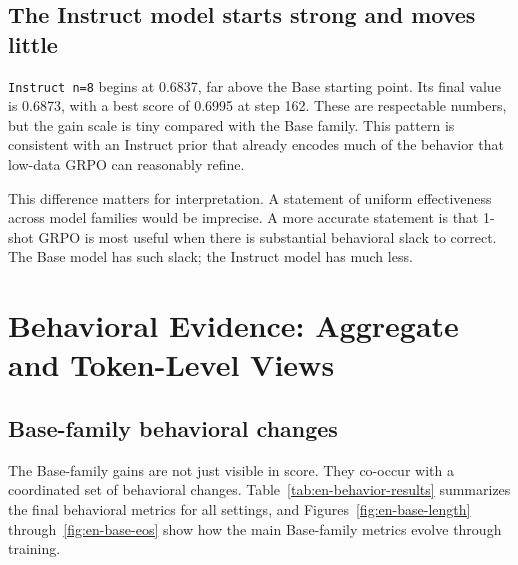 \documentclass[12pt,a4paper]{ctexart}
\begin{document}
\subsection{The Instruct model starts strong and moves little}

\texttt{Instruct n=8} begins at 0.6837, far above the Base starting point. Its final value is 0.6873, with a best score of 0.6995 at step 162. These are respectable numbers, but the gain scale is tiny compared with the Base family. This pattern is consistent with an Instruct prior that already encodes much of the behavior that low-data GRPO can reasonably refine.

This difference matters for interpretation. A statement of uniform effectiveness across model families would be imprecise. A more accurate statement is that 1-shot GRPO is most useful when there is substantial behavioral slack to correct. The Base model has such slack; the Instruct model has much less.

\section{Behavioral Evidence: Aggregate and Token-Level Views}

\subsection{Base-family behavioral changes}

The Base-family gains are not just visible in score. They co-occur with a coordinated set of behavioral changes. Table~\ref{tab:en-behavior-results} summarizes the final behavioral metrics for all settings, and Figures~\ref{fig:en-base-length} through~\ref{fig:en-base-eos} show how the main Base-family metrics evolve through training.
\end{document}
